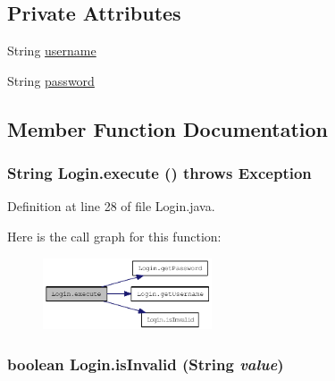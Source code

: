 \subsection*{Private Attributes}
\begin{CompactItemize}
\item 
String \hyperlink{classLogin_d2b4d8a7c18f724cef7e3494e15a3f0a}{username}
\item 
String \hyperlink{classLogin_073065569cb434a1d28d841123d4d137}{password}
\end{CompactItemize}


\subsection{Member Function Documentation}
\hypertarget{classLogin_f33faf44bca35f89e27d3b5c53869365}{
\subsubsection{\setlength{\rightskip}{0pt plus 5cm}String Login.execute ()  throws Exception }}
\label{classLogin_f33faf44bca35f89e27d3b5c53869365}




Definition at line 28 of file Login.java.

Here is the call graph for this function:\nopagebreak
\begin{figure}[H]
\begin{center}
\leavevmode
\includegraphics[width=142pt]{classLogin_f33faf44bca35f89e27d3b5c53869365_cgraph}
\end{center}
\end{figure}
\hypertarget{classLogin_79c55a63f21caff65ec04a20cb9922d0}{
\subsubsection{\setlength{\rightskip}{0pt plus 5cm}boolean Login.isInvalid (String {\em value})}}
\label{classLogin_79c55a63f21caff65ec04a20cb9922d0}




